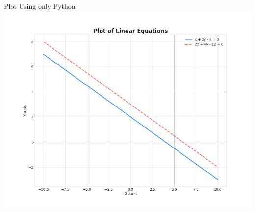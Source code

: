 \documentclass{beamer}
\begin{document}
\begin{frame}{Plot-Using only Python}
    \centering
    \includegraphics[width=\columnwidth, height=0.8\textheight, keepaspectratio]{figs/lines2.png}     
\end{frame}
\end{document}

